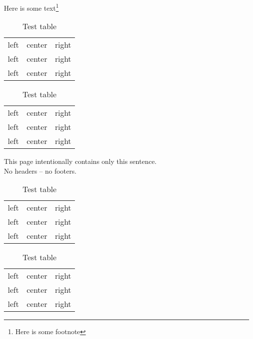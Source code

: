 \documentclass{article}
\begin{document}
\newpage

Here is some text\footnote{Here is some footnote}

\begin{table}[t]
  \centering
  \begin{tabular}{lcr}
    left & center & right \\
    left & center & right \\
    left & center & right \\
  \end{tabular}
  \caption{Test table}
\end{table}

\lipsum

\begin{table}[b]
  \centering
  \begin{tabular}{lcr}
    left & center & right \\
    left & center & right \\
    left & center & right \\
  \end{tabular}
  \caption{Test table}
\end{table}
\lipsum[1]
\clearpage
\begingroup
\pagestyle{empty}\mbox{}
   \vspace*{\fill}
   \begin{center}
     This page intentionally contains only this sentence.\\
     No headers -- no footers.
   \end{center}
   \vspace{\fill}
\cleardoublepage
\endgroup
\begin{table}[p]
  \centering
  \begin{tabular}{lcr}
    left & center & right \\
    left & center & right \\
    left & center & right \\
  \end{tabular}
  \caption{Test table}
\end{table}

\begin{table}[p]
  \centering
  \begin{tabular}{lcr}
    left & center & right \\
    left & center & right \\
    left & center & right \\
  \end{tabular}
  \caption{Test table}
\end{table}
\end{document}
